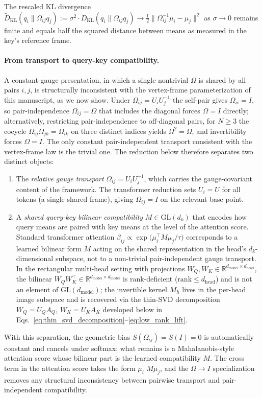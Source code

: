 The rescaled KL divergence $\widetilde{D}_{\mathrm{KL}}(q_i \| \Omega_{ij}q_j) := \sigma^2 \cdot D_{\mathrm{KL}}(q_i \| \Omega_{ij}q_j) \to \frac{1}{2}\|\Omega_{ij}^{-1}\mu_i - \mu_j\|^2$ as $\sigma \to 0$ remains finite and equals half the squared distance between means as measured in the key's reference frame.

\paragraph{From transport to query-key compatibility.}

A constant-gauge presentation, in which a single nontrivial $\Omega$ is shared by all pairs $i,j$, is structurally inconsistent with the vertex-frame parameterization of this manuscript, as we now show. Under $\Omega_{ij} = U_iU_j^{-1}$ the self-pair gives $\Omega_{ii} = I$, so pair-independence $\Omega_{ij} = \Omega$ that includes the diagonal forces $\Omega = I$ directly; alternatively, restricting pair-independence to off-diagonal pairs, for $N \geq 3$ the cocycle $\Omega_{ij}\Omega_{jk} = \Omega_{ik}$ on three distinct indices yields $\Omega^2 = \Omega$, and invertibility forces $\Omega = I$. The only constant pair-independent transport consistent with the vertex-frame law is the trivial one. The reduction below therefore separates two distinct objects:
\begin{enumerate}
\item The \emph{relative gauge transport} $\Omega_{ij} = U_iU_j^{-1}$, which carries the gauge-covariant content of the framework. The transformer reduction sets $U_i = U$ for all tokens (a single shared frame), giving $\Omega_{ij} = I$ on the relevant base point.
\item A \emph{shared query-key bilinear compatibility} $M \in \mathrm{GL}(d_k)$ that encodes how query means are paired with key means at the level of the attention score. Standard transformer attention $\beta_{ij} \propto \exp\big(\mu_i^\top M \mu_j / \tau\big)$ corresponds to a learned bilinear form $M$ acting on the shared representation in the head's $d_k$-dimensional subspace, not to a non-trivial pair-independent gauge transport. In the rectangular multi-head setting with projections $W_Q, W_K \in \mathbb{R}^{d_{\text{model}} \times d_{\text{head}}}$, the bilinear $W_Q W_K^\top \in \mathbb{R}^{d_{\text{model}}\times d_{\text{model}}}$ is rank-deficient ($\mathrm{rank} \le d_{\text{head}}$) and is not an element of $\mathrm{GL}(d_{\text{model}})$; the invertible kernel $M_h$ lives in the per-head image subspace and is recovered via the thin-SVD decomposition $W_Q = U_Q A_Q$, $W_K = U_K A_K$ developed below in Eqs.~\eqref{eq:thin_svd_decomposition}--\eqref{eq:low_rank_lift}.
\end{enumerate}
With this separation, the geometric bias $S(\Omega_{ij}) = S(I) = 0$ is automatically constant and cancels under softmax; what remains is a Mahalanobis-style attention score whose bilinear part is the learned compatibility $M$. The cross term in the attention score takes the form $\mu_i^\top M \mu_j$, and the $\Omega \to I$ specialization removes any structural inconsistency between pairwise transport and pair-independent compatibility.

